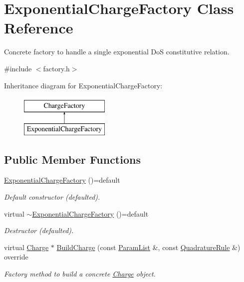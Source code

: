 \hypertarget{classExponentialChargeFactory}{\section{Exponential\-Charge\-Factory Class Reference}
\label{classExponentialChargeFactory}
}


Concrete factory to handle a single exponential Do\-S constitutive relation.  




{\ttfamily \#include $<$factory.\-h$>$}

Inheritance diagram for Exponential\-Charge\-Factory\-:\begin{figure}[H]
\begin{center}
\leavevmode
\includegraphics[height=2.000000cm]{classExponentialChargeFactory}
\end{center}
\end{figure}
\subsection*{Public Member Functions}
\begin{DoxyCompactItemize}
\item 
\hypertarget{classExponentialChargeFactory_a857af7212bef3bc0691b90f82160ede0}{\hyperlink{classExponentialChargeFactory_a857af7212bef3bc0691b90f82160ede0}{Exponential\-Charge\-Factory} ()=default}\label{classExponentialChargeFactory_a857af7212bef3bc0691b90f82160ede0}

\begin{DoxyCompactList}\small\item\em Default constructor (defaulted). \end{DoxyCompactList}\item 
\hypertarget{classExponentialChargeFactory_a27be0c4dbe004a49db0065cd9e26bb04}{virtual \hyperlink{classExponentialChargeFactory_a27be0c4dbe004a49db0065cd9e26bb04}{$\sim$\-Exponential\-Charge\-Factory} ()=default}\label{classExponentialChargeFactory_a27be0c4dbe004a49db0065cd9e26bb04}

\begin{DoxyCompactList}\small\item\em Destructor (defaulted). \end{DoxyCompactList}\item 
virtual \hyperlink{classCharge}{Charge} $\ast$ \hyperlink{classExponentialChargeFactory_a1e1718ca16c1624e98865bc6359c2136}{Build\-Charge} (const \hyperlink{classParamList}{Param\-List} \&, const \hyperlink{classQuadratureRule}{Quadrature\-Rule} \&) override
\begin{DoxyCompactList}\small\item\em Factory method to build a concrete \hyperlink{classCharge}{Charge} object. \end{DoxyCompactList}\end{DoxyCompactItemize}



